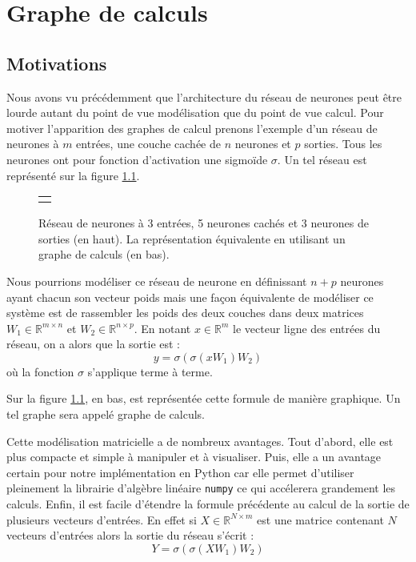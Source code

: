\chapter{Graphe de calculs}

\section{Motivations}

Nous avons vu précédemment que l'architecture du réseau de neurones peut être lourde autant du point de vue modélisation que du point de vue calcul. Pour motiver l'apparition des graphes de calcul prenons l'exemple d'un réseau de neurones à $m$ entrées, une couche cachée de $n$ neurones et $p$ sorties. Tous les neurones ont pour fonction d'activation une sigmoïde $\sigma$. Un tel réseau est représenté sur la figure \ref{reseau_3_5_3}.

\begin{figure}
\begin{center}
\begin{tabular}{c}
 \\
 \\
\end{tabular}
\end{center}
\caption{Réseau de neurones à 3 entrées, 5 neurones cachés et 3 neurones de sorties (en haut). La représentation équivalente en utilisant un graphe de calculs (en bas).}
\label{reseau_3_5_3}
\end{figure}

Nous pourrions modéliser ce réseau de neurone en définissant $n+p$ neurones ayant chacun son vecteur poids mais une façon équivalente de modéliser ce système est de rassembler les poids des deux couches dans deux matrices $W_1 \in \mathbb{R}^{m \times n}$ et $W_2 \in \mathbb{R}^{n \times p}$. En notant $x \in \mathbb{R}^m$ le vecteur ligne des entrées du réseau, on a alors que la sortie est :
\begin{equation}
y = \sigma(\sigma(xW_1)W_2)
\label{eq_3_5_3}
\end{equation}
où la fonction $\sigma$ s'applique terme à terme. 

Sur la figure \ref{reseau_3_5_3}, en bas, est représentée cette formule de manière graphique. Un tel graphe sera appelé graphe de calculs.

Cette modélisation matricielle a de nombreux avantages. Tout d'abord, elle est plus compacte et simple à manipuler et à visualiser. Puis, elle a un avantage certain pour notre implémentation en Python car elle permet d'utiliser pleinement la librairie d'algèbre linéaire \texttt{numpy} ce qui accélerera grandement les calculs. Enfin, il est facile d'étendre la formule précédente au calcul de la sortie de plusieurs vecteurs d'entrées. En effet si $X \in \mathbb{R}^{N \times m}$ est une matrice contenant $N$ vecteurs d'entrées alors la sortie du réseau s'écrit :
$$Y = \sigma(\sigma(XW_1)W_2)$$

